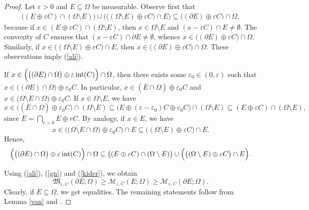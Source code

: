\documentclass[pdflatex,sn-mathphys-num]{sn-jnl}
\theoremstyle{plain}
\theoremstyle{definition}
\DeclareMathOperator{\inter}{\textup{int}}
\begin{document}
\begin{proof}
Let $\varepsilon>0$ and $E\subseteq\Omega$ be measurable. Observe first that
\begin{align}\label{ali}
\big((E\oplus\varepsilon C)\cap (\Omega\setminus E)\big)\cup\Big(\big((\Omega\setminus E)\oplus\varepsilon C\big)\cap E\Big) \subseteq \big((\partial E)\oplus \varepsilon C\big)\cap\Omega,
\end{align}
because if $x\in(E\oplus\varepsilon C)\cap (\Omega\setminus E)$, then $x\in\Omega\setminus E$ and $(x-\varepsilon C)\cap E\neq\emptyset$. The convexity of $C$ ensures that $(x-\varepsilon C)\cap \partial E\neq\emptyset$, whence $x\in\big((\partial E)\oplus \varepsilon C\big)\cap\Omega$. Similarly, if $x\in\big((\Omega\setminus E)\oplus\varepsilon C\big)\cap E$, then $x\in\big((\partial E)\oplus \varepsilon C\big)\cap\Omega$. These observations imply (\ref{ali}).

If $x\in\Big(\big((\partial E)\cap\Omega\big)\oplus \varepsilon \inter(C)\Big)\cap\Omega$, then there exists some $\varepsilon_0\in(0, \varepsilon)$ such that $x\in\big((\partial E)\cap\Omega\big)\oplus \varepsilon_0 C$. In particular, $x\in (\overline{E}\cap\Omega)\oplus \varepsilon_0 C$ and $x\in \big(\overline{\Omega\setminus E}\cap\Omega\big)\oplus \varepsilon_0 C$. If $x\in \Omega\setminus E$, we have
\[
x\in \big((\overline{E}\cap\Omega)\oplus \varepsilon_0 C\big)\cap(\Omega\setminus E)\subseteq \big(E\oplus (\varepsilon-\varepsilon_0)C\oplus\varepsilon_0 C\big)\cap(\Omega\setminus E)\subseteq (E\oplus\varepsilon C)\cap(\Omega\setminus E),
\]
since $\overline{E}=\bigcap_{r>0}E\oplus rC$. By analogy, if $x\in E$, we have
\[
x\in \Big(\big(\overline{\Omega\setminus E}\cap\Omega\big)\oplus \varepsilon_0 C\Big)\cap E\subseteq\big((\Omega\setminus E)\oplus\varepsilon C\big)\cap E.
\]
Hence,
\begin{equation}\label{gn}
\Big(\big((\partial E)\cap\Omega\big)\oplus \varepsilon \inter(C)\Big)\cap\Omega\subseteq\big((E\oplus\varepsilon C)\cap(\Omega\setminus E)\big)\cup\Big(\big((\Omega\setminus E)\oplus\varepsilon C\big)\cap E\Big).
\end{equation}

Using (\ref{ali}), (\ref{gn}) and (\ref{kider}), we obtain
\[
\mathfrak{M}_{\varepsilon, C}(\partial E; \Omega)\geq\mathscr{M}_{\varepsilon, C}(E; \Omega)\geq\mathcal{M}_{\varepsilon, C}(\partial E; \Omega).
\]
Clearly, if $\overline{E}\subseteq\Omega$, we get equalities. The remaining statements follow from Lemma \ref{van} and \cite[Theorem 3]{Villa4}.
\end{proof}
\end{document}
